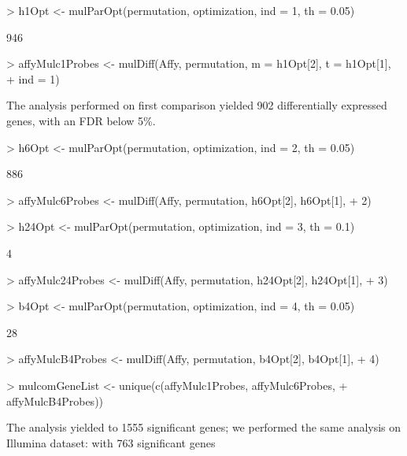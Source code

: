 \documentclass[a4paper]{article}
\begin{document}
\begin{Schunk}
\begin{Sinput}
> h1Opt <- mulParOpt(permutation, optimization, ind = 1, th = 0.05)
\end{Sinput}
\begin{Soutput}
[1] 946
\end{Soutput}
\begin{Sinput}
> affyMulc1Probes <- mulDiff(Affy, permutation, m = h1Opt[2], t = h1Opt[1], 
+     ind = 1)
\end{Sinput}
\end{Schunk}
The analysis performed on first comparison yielded 902 differentially expressed genes,
with an FDR below 5\%.
\begin{Schunk}
\begin{Sinput}
> h6Opt <- mulParOpt(permutation, optimization, ind = 2, th = 0.05)
\end{Sinput}
\begin{Soutput}
[1] 886
\end{Soutput}
\begin{Sinput}
> affyMulc6Probes <- mulDiff(Affy, permutation, h6Opt[2], h6Opt[1], 
+     2)
\end{Sinput}
\end{Schunk}
\begin{Schunk}
\begin{Sinput}
> h24Opt <- mulParOpt(permutation, optimization, ind = 3, th = 0.1)
\end{Sinput}
\begin{Soutput}
[1] 4
\end{Soutput}
\begin{Sinput}
> affyMulc24Probes <- mulDiff(Affy, permutation, h24Opt[2], h24Opt[1], 
+     3)
\end{Sinput}
\end{Schunk}
\begin{Schunk}
\begin{Sinput}
> b4Opt <- mulParOpt(permutation, optimization, ind = 4, th = 0.05)
\end{Sinput}
\begin{Soutput}
[1] 28
\end{Soutput}
\begin{Sinput}
> affyMulcB4Probes <- mulDiff(Affy, permutation, b4Opt[2], b4Opt[1], 
+     4)
\end{Sinput}
\end{Schunk}
\begin{Schunk}
\begin{Sinput}
> mulcomGeneList <- unique(c(affyMulc1Probes, affyMulc6Probes, 
+     affyMulcB4Probes))
\end{Sinput}
\end{Schunk}
The analysis yielded to 1555 significant genes; we performed the same analysis on Illumina dataset: with 763 significant genes 
\end{document}
